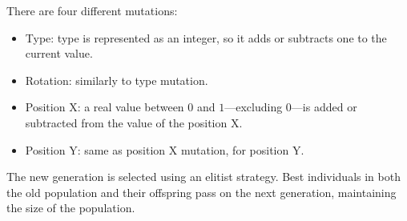There are four different mutations:

\begin{itemize}
	\item Type: type is represented as an integer, so it adds or subtracts one to the current value.
	\item Rotation: similarly to type mutation.
	\item Position X: a real value between $0$ and $1$---excluding $0$---is added or subtracted from the value of the position X.
	\item Position Y: same as position X mutation, for position Y.
\end{itemize}

The new generation is selected using an elitist strategy. Best individuals in both the old population and their offspring pass on the next generation, maintaining the size of the population.



